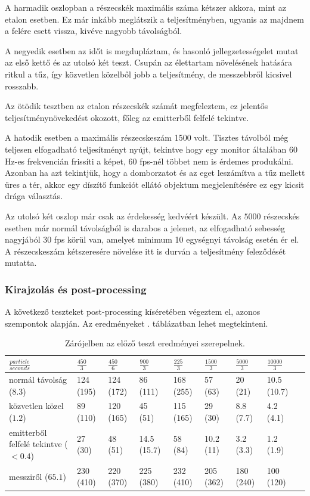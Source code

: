 A harmadik oszlopban a részecskék maximális száma kétszer akkora, mint az etalon esetben. Ez már inkább meglátszik a teljesítményben, ugyanis az majdnem a felére esett vissza, kivéve nagyobb távolságból.

A negyedik esetben az időt is megdupláztam, és hasonló jellegzetességelet mutat az első kettő és az utolsó két teszt. Csupán az élettartam növelésének hatására ritkul a tűz, így közvetlen közelből jobb a teljesítmény, de messzebbről kicsivel rosszabb. 

Az ötödik tesztben az etalon részecskék számát megfeleztem, ez jelentős teljesítménynövekedést okozott, főleg az emitterből felfelé tekintve.

A hatodik esetben a maximális részecskeszám 1500 volt. Tisztes távolból még teljesen elfogadható teljesítményt nyújt, tekintve hogy egy monitor általában 60 Hz-es frekvencián frissíti a képet, 60 fps-nél többet nem is érdemes produkálni. Azonban ha azt tekintjük, hogy a domborzatot és az eget leszámítva a tűz mellett üres a tér, akkor egy díszítő funkciót ellátó objektum megjelenítésére ez egy kicsit drága választás.

Az utolsó két oszlop már csak az érdekesség kedvéért készült. Az $5000$ részecskés esetben már normál távolságból is darabos a jelenet, az elfogadható sebesség nagyjából 30 fps körül van, amelyet minimum 10 egységnyi távolság esetén ér el. A részecskeszám kétszeresére növelése itt is durván a teljesítmény feleződését mutatta.

\subsubsection{Kirajzolás és post-processing}
A következő teszteket post-processing kíséretében végeztem el, azonos szempontok alapján. Az eredményeket . táblázatban lehet megtekinteni.

\begin{table}[h!]
\centering
\begin{tabular}{ m{10em}|C{1cm}|C{1cm}|C{1cm}|C{1cm}|C{1cm}|C{1cm}|C{1cm}|C{1cm}| } 
 $\frac{particle}{seconds}$ & $\frac{450}{3}$ & $\frac{450}{6}$ & $\frac{900}{3}$ & $\frac{225}{3}$ & $\frac{1500}{3}$ & $\frac{5000}{3}$ & $\frac{10000}{3}$ \\  \hline
 
 normál távolság ($8.3$)                   & 124  (195) & 124 (172)  & 86 (111)     & 168 (255)  & 57 (63)     & 20 (21) & 10.5 (10.7) \\  \hline
 közvetlen közel ($1.2$)                    & 89 (110)   & 120 (165)  & 45 (51)       & 115 (165)  & 29 (30)     & 8.8 (7.7) & 4.2 (4.1) \\  \hline
 emitterből felfelé tekintve ($<0.4$) & 27 (30)     &  48 (51)    & 14.5 (15.7) & 58 (84)      & 10.2 (11)  & 3.2 (3.3) & 1.2 (1.9)  \\ \hline
 messziről ($65.1$)                            & 230 (410) &  220 (370) & 225 (380)   & 232 (410)  & 205 (362)   & 180 (240) & 100 (120) \\ 
 \hline
\end{tabular}
\caption{Zárójelben az előző teszt eredményei szerepelnek.}
\label{table:2}
\end{table}


